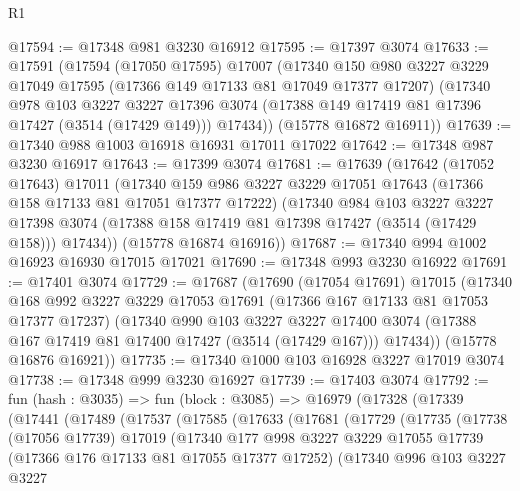 \begin{lexlean}{R1}
\begin{coremodule}
@17594 := @17348 @981 @3230 @16912
@17595 := @17397 @3074
@17633 := @17591
    (@17594
      (@17050 @17595)
      @17007
      (@17340
        @150
        @980
        @3227
        @3229
        @17049
        @17595
        (@17366 @149 @17133 @81 @17049 @17377 @17207)
        (@17340
          @978
          @103
          @3227
          @3227
          @17396
          @3074
          (@17388 @149 @17419 @81 @17396 @17427 (@3514 (@17429 @149)))
          @17434))
      (@15778 @16872 @16911))
@17639 := @17340 @988 @1003 @16918 @16931 @17011 @17022
@17642 := @17348 @987 @3230 @16917
@17643 := @17399 @3074
@17681 := @17639
    (@17642
      (@17052 @17643)
      @17011
      (@17340
        @159
        @986
        @3227
        @3229
        @17051
        @17643
        (@17366 @158 @17133 @81 @17051 @17377 @17222)
        (@17340
          @984
          @103
          @3227
          @3227
          @17398
          @3074
          (@17388 @158 @17419 @81 @17398 @17427 (@3514 (@17429 @158)))
          @17434))
      (@15778 @16874 @16916))
@17687 := @17340 @994 @1002 @16923 @16930 @17015 @17021
@17690 := @17348 @993 @3230 @16922
@17691 := @17401 @3074
@17729 := @17687
    (@17690
      (@17054 @17691)
      @17015
      (@17340
        @168
        @992
        @3227
        @3229
        @17053
        @17691
        (@17366 @167 @17133 @81 @17053 @17377 @17237)
        (@17340
          @990
          @103
          @3227
          @3227
          @17400
          @3074
          (@17388 @167 @17419 @81 @17400 @17427 (@3514 (@17429 @167)))
          @17434))
      (@15778 @16876 @16921))
@17735 := @17340 @1000 @103 @16928 @3227 @17019 @3074
@17738 := @17348 @999 @3230 @16927
@17739 := @17403 @3074
@17792 := fun (hash : @3035) =>
  fun (block : @3085) =>
  @16979
    (@17328
      (@17339
        (@17441
          (@17489
            (@17537
              (@17585
                (@17633
                  (@17681
                    (@17729
                      (@17735
                        (@17738
                          (@17056 @17739)
                          @17019
                          (@17340
                            @177
                            @998
                            @3227
                            @3229
                            @17055
                            @17739
                            (@17366 @176 @17133 @81 @17055 @17377 @17252)
                            (@17340
                              @996
                              @103
                              @3227
                              @3227

\end{coremodule}
\end{lexlean}
